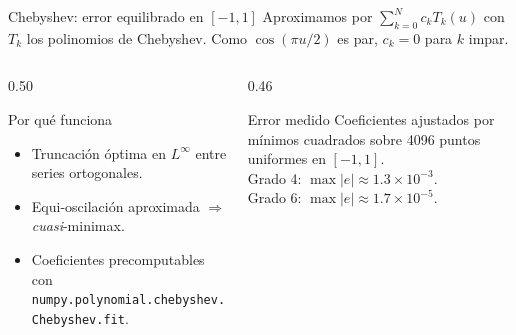 \documentclass[aspectratio=169,10pt]{beamer}
\begin{document}
\begin{frame}{Chebyshev: error equilibrado en $[-1,1]$}
  \footnotesize
  Aproximamos por $\sum_{k=0}^{N} c_{k} T_{k}(u)$ con $T_{k}$ los polinomios
  de Chebyshev. Como $\cos(\pi u/2)$ es par, $c_{k}=0$ para $k$ impar.

  \begin{columns}[T]
    \begin{column}{0.50\textwidth}
      \begin{block}{Por qué funciona}
        \begin{itemize}\setlength\itemsep{2pt}
          \item Truncación óptima en $L^{\infty}$ entre series ortogonales.
          \item Equi-oscilación aproximada $\Rightarrow$ \emph{cuasi}-minimax.
          \item Coeficientes precomputables con
                \texttt{numpy.polynomial.chebyshev.Chebyshev.fit}.
        \end{itemize}
      \end{block}
    \end{column}
    \begin{column}{0.46\textwidth}
      \begin{exampleblock}{Error medido}
        Coeficientes ajustados por mínimos cuadrados sobre 4096 puntos
        uniformes en $[-1,1]$.\\[2pt]
        Grado 4: $\max|e| \approx 1.3\!\times\!10^{-3}$.\\
        Grado 6: $\max|e| \approx 1.7\!\times\!10^{-5}$.
      \end{exampleblock}
    \end{column}
  \end{columns}
\end{frame}
\end{document}
